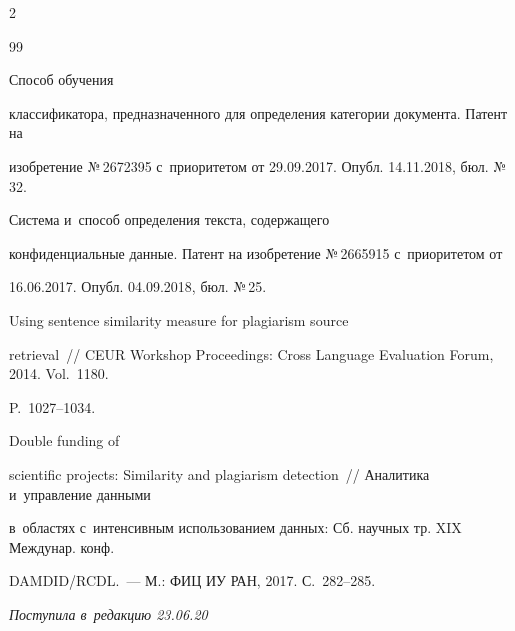 \begin{multicols}{2}
{{\begin{thebibliography}{99}


 Способ обучения 


классификатора, предназначенного для определения категории документа. Патент на 


изобретение №\,2672395 с~приоритетом от 29.09.2017. Опубл. 14.11.2018, бюл. №\,32.




 Система и~способ определения текста, содержащего 


конфиденциальные данные. Патент на изобретение №\,2665915 с~приоритетом от 


16.06.2017. Опубл. 04.09.2018, бюл. №\,25.




 Using sentence similarity measure for plagiarism source 


retrieval~// CEUR Workshop Proceedings: Cross Language Evaluation Forum, 2014. Vol.~1180.


P.~1027--1034.




 Double funding of 


scientific projects: Similarity and plagiarism detection~// Аналитика и~управ\-ле\-ние данными 


в~областях с~интенсивным использованием данных: Сб. научных тр. XIX Междунар. конф. 


\mbox{DAMDID}/RCDL.~--- М.: ФИЦ ИУ РАН, 2017. С.~282--285.





\end{thebibliography}





 }


 }





\end{multicols}





\vspace*{-6pt}





\hfill{\small\textit{Поступила в~редакцию 23.06.20}}





